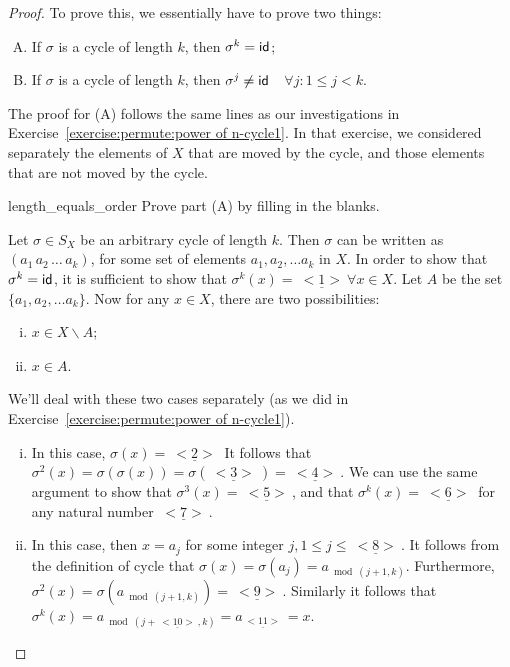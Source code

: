 \begin{proof}
To prove this, we essentially have to prove two things:
\begin{enumerate}[(A)]
\item
If $\sigma$ is a cycle of length $k$, then $\sigma^k = {\sf{i}d} $;
\item
If $\sigma$ is a cycle of length $k$, then $\sigma^j \neq {\sf{i}d} $~~$\forall j: 1 \le j < k.$
\end{enumerate}

\noindent
The proof for (A) follows the same lines as our investigations in Exercise~\ref{exercise:permute:power of n-cycle1}. In that exercise, we considered separately the elements of $X$ that are moved by the cycle, and those elements that are not moved by the cycle. 

\begin{exercise}{length_equals_order} Prove part (A) by filling in the blanks.

\noindent
Let $\sigma \in S_X$ be an arbitrary cycle of length $k$.  Then $\sigma$ can be written as $ (a_1 \, a_2 \, \ldots \, a_k)$, for some set of elements $a_1, a_2, \ldots a_k$ in $X$.  In order to show that $\sigma^k = {\sf{i}d} $, it is sufficient to show that 
$\sigma^k(x) = \underline{~<1>~}  \forall x \in X$. 
Let $A$ be the set  $\{a_1, a_2, \ldots a_k\}$.  Now for any $x \in X$, there are two possibilities:  
\begin{enumerate}[(i)]
\item
$x \in  X \backslash A$;
\item
$x \in A$. 
\end{enumerate}

\noindent
We'll deal with these two cases separately (as we did  in Exercise~\ref{exercise:permute:power of n-cycle1}).

\begin{enumerate}[(i)]
\item
In this case, $\sigma(x) = \underline{~<2>~} $  It follows that $\sigma^2(x) = \sigma( \sigma(x)) = \sigma( \underline{~<3>~}) = \underline{~<4>~}$. We can use the same argument to show that $\sigma^3(x) = \underline{~<5>~}$, and that $\sigma^k(x) = \underline{~<6>~}$ for any natural number $\underline{~<7>~}$.
\item
In this case, then $x = a_j$ for some integer $j, 1 \le j \le \underline{~<8>~}$.  It follows from the definition of cycle that $\sigma(x) = \sigma(a_j) = a_{\bmod(j+1,k)}$. Furthermore, $\sigma^2(x) = \sigma(a_{\bmod(j+1,k)}) = \underline{~<9>~}$. Similarly it follows that $\sigma^{k}(x) = a_{\bmod(j+ \underline{~<10>~},k)} = a_{\underline{~<11>~}} = x$.
\end{enumerate}


\end{exercise}
\end{proof}
